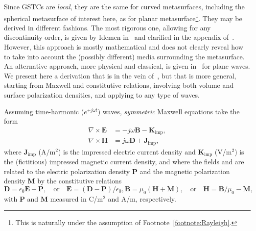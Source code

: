 \documentclass[journal,transaction]{IEEEtran}
\newcommand{\ve}[1]{\mathbf{#1}}
\begin{document}
Since GSTCs are \emph{local}, they are the same for curved metasurfaces, including the spherical metasurface of interest here, as for planar metasurface\footnote{This is naturally under the assumption of Footnote~\ref{footnote:Rayleigh}.}. They may be derived in different fashions. The most rigorous one, allowing for any discontinuity order, is given by Idemen in~\cite{GSTCs_Idemen2011} and clarified in the appendix of~\cite{synthesis_planar_KA2015}. However, this approach is mostly mathematical and does not clearly reveal how to take into account the (possibly different) media surrounding the metasurface. An alternative approach, more physical and classical, is given in~\cite{tretyakov2016framework} for plane waves. We present here a derivation that is in the vein of~\cite{tretyakov2016framework}, but that is more general, starting from Maxwell and constitutive relations, involving both volume and surface polarization densities, and applying to any type of waves.

Assuming time-harmonic ($e^{+j\omega t}$) waves, \emph{symmetric} Maxwell equations take the form
%
\begin{subequations}\label{Eq:harm_maxwell}
\begin{align}
\nabla\times\ve{E}&=-j\omega\ve{B}-\ve{K}_\text{imp}, \\
\nabla\times\ve{H}&=j\omega\ve{D}+\ve{J}_\text{imp},
\end{align}
\end{subequations}
%
where $\ve{J}_\text{imp}$ (A/m$^2$) is the impressed electric current density and $\ve{K}_\text{imp}$ (V/m$^2$) is the (fictitious) impressed magnetic current density, and where the fields and  are related to the electric polarization density $\ve{P}$ and the magnetic polarization density $\ve{M}$ by the constitutive relations
%
\begin{subequations}\label{eq:const_rel}
\begin{equation}\label{eq:const_rel_el}
\ve{D}=\epsilon_0\ve{E}+\ve{P},
\quad\text{or}\quad
\ve{E}=(\ve{D}-\ve{P})/\epsilon_0,
\end{equation}
\begin{equation}\label{eq:const_rel_mag}
\ve{B}=\mu_0(\ve{H}+\ve{M}),
\quad\text{or}\quad
\ve{H}=\ve{B}/\mu_0-\ve{M},
\end{equation}
\end{subequations}
%
with $\ve{P}$ and $\ve{M}$ measured in C/m$^2$ and A/m, respectively.
\end{document}
